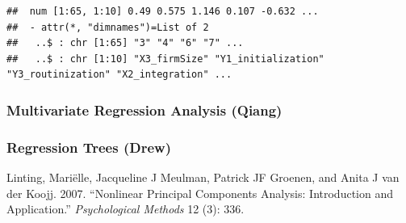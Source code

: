 \documentclass[
]{article}
\begin{document}
\begin{verbatim}
##  num [1:65, 1:10] 0.49 0.575 1.146 0.107 -0.632 ...
##  - attr(*, "dimnames")=List of 2
##   ..$ : chr [1:65] "3" "4" "6" "7" ...
##   ..$ : chr [1:10] "X3_firmSize" "Y1_initialization" "Y3_routinization" "X2_integration" ...
\end{verbatim}

\hypertarget{multivariate-regression-analysis-qiang}{%
\subsubsection{Multivariate Regression Analysis
(Qiang)}\label{multivariate-regression-analysis-qiang}}

\hypertarget{regression-trees-drew}{%
\subsubsection*{Regression Trees (Drew)}\label{regression-trees-drew}}

\hypertarget{refs}{}
\leavevmode\hypertarget{ref-linting2007nonlinear}{}%
Linting, Mariëlle, Jacqueline J Meulman, Patrick JF Groenen, and Anita J
van der Koojj. 2007. ``Nonlinear Principal Components Analysis:
Introduction and Application.'' \emph{Psychological Methods} 12 (3):
336.
\end{document}
